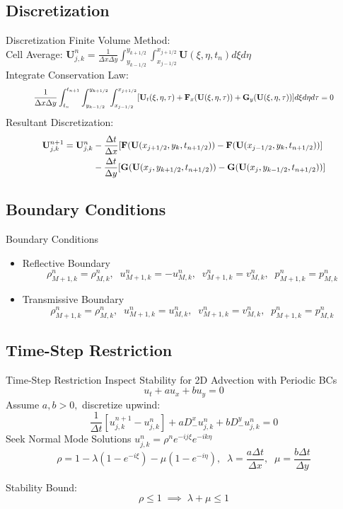 \documentclass{beamer}
\newcommand{\mbf}{\mathbf}
\newcommand{\bq}{\begin{equation}}
\newcommand{\eq}{\end{equation}}
\newcommand\scalemath[2]{\scalebox{#1}{\mbox{\ensuremath{\displaystyle #2}}}}
\begin{document}
\subsection{Discretization}
\begin{frame}{Discretization}
Finite Volume Method:\\
Cell Average: $\mbf{U}_{j,k}^n=\frac{1}{\Delta x \Delta y}\int_{y_{k-1/2}}^{y_{k+1/2}}\int_{x_{j-1/2}}^{x_{j+1/2}}\mbf{U}(\xi,\eta,t_n)d\xi d\eta$\\
Integrate Conservation Law:
\bq \scalemath{.8}{\frac{1}{\Delta x \Delta y}\int_{t_n}^{t_{n+1}}\int_{y_{k-1/2}}^{y_{k+1/2}}\int_{x_{j-1/2}}^{x_{j+1/2}}[\mbf{U}_t(\xi,\eta,\tau)+\mbf{F}_x(\mbf{U}(\xi,\eta,\tau))+\mbf{G}_y(\mbf{U}(\xi,\eta,\tau))]d\xi d\eta d\tau=0}\eq
Resultant Discretization:
\bq 
\scalemath{.9}{
\begin{split}
\mbf{U}_{j,k}^{n+1}=\mbf{U}_{j,k}^n&-\frac{\Delta t}{\Delta x}[\mbf{F}(\mbf{U}(x_{j+1/2},y_k,t_{n+1/2}))-\mbf{F}(\mbf{U}(x_{j-1/2},y_k,t_{n+1/2}))]\\
&-\frac{\Delta t}{\Delta y}[\mbf{G}(\mbf{U}(x_j,y_{k+1/2},t_{n+1/2}))-\mbf{G}(\mbf{U}(x_j,y_{k-1/2},t_{n+1/2}))]\end{split}}\eq

\end{frame}


\subsection{Boundary Conditions}
\begin{frame}{Boundary Conditions}
\begin{itemize}
\item Reflective Boundary
\bq \rho_{M+1,k}^n=\rho_{M,k}^n,\;\; u_{M+1,k}^n=-u_{M,k}^n,\;\; v_{M+1,k}^n=v_{M,k}^n,\;\; p_{M+1,k}^n=p_{M,k}^n\eq

\item Transmissive Boundary
\bq \rho_{M+1,k}^n=\rho_{M,k}^n,\;\; u_{M+1,k}^n=u_{M,k}^n,\;\; v_{M+1,k}^n=v_{M,k}^n,\;\; p_{M+1,k}^n=p_{M,k}^n\eq

\end{itemize}
\end{frame}

\subsection{Time-Step Restriction}
\begin{frame}{Time-Step Restriction}
Inspect Stability for 2D Advection with Periodic BCs
\bq u_t+au_x+bu_y=0\eq
Assume $a,b>0,$ discretize upwind:\\
\bq \frac{1}{\Delta t}[u_{j,k}^{n+1}-u_{j,k}^n]+aD_-^x u_{j,k}^n+bD_-^y u_{j,k}^n=0\eq
Seek Normal Mode Solutions $u_{j,k}^n=\rho^ne^{-ij\xi}e^{-ik\eta}$ 
\bq \rho=1-\lambda(1-e^{-i\xi})-\mu(1-e^{-i\eta}),\;\; \lambda=\frac{a\Delta t}{\Delta x},\;\; \mu=\frac{b\Delta t}{\Delta y}\eq

Stability Bound:\\
\bq \rho\leq1\;\implies\;\lambda+\mu\leq 1\eq
\end{frame}
\end{document}
